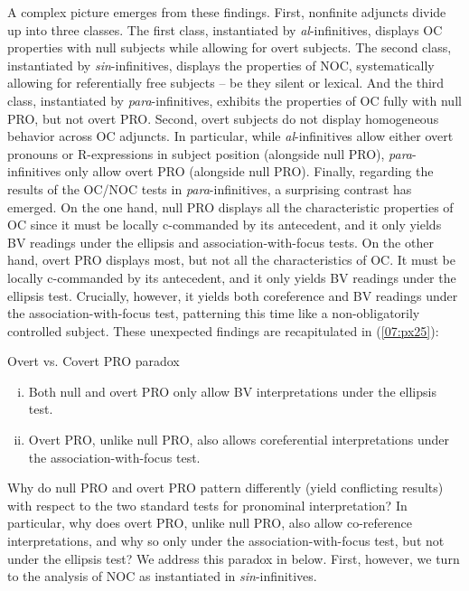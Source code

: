 \documentclass[output=paper,colorlinks,citecolor=brown,draft,draftmode]{langscibook}
\begin{document}
A complex picture emerges from these findings. First, nonfinite adjuncts divide up into three classes. The first class, instantiated by \textit{al}-infinitives, displays OC properties with null subjects while allowing for overt subjects. The second class, instantiated by \textit{sin}-infinitives, displays the properties of NOC, systematically allowing for referentially free subjects -- be they silent or lexical. And the third class, instantiated by \textit{para}-infinitives, exhibits the properties of OC fully with null PRO, but not overt PRO.
Second, overt subjects do not display homogeneous behavior across OC adjuncts. In particular, while  \textit{al}-infinitives allow either overt pronouns or R-expressions in subject position (alongside null PRO), \textit{para}-infinitives only allow overt PRO (alongside null PRO).
Finally, regarding the results of the OC/NOC tests in \textit{para}-infinitives, a surprising contrast has emerged. On the one hand, null PRO displays all the characteristic properties of OC since it must be locally c-commanded by its antecedent, and it only yields BV readings under the ellipsis and association-with-focus tests. On the other hand, overt PRO displays most, but not all the characteristics of OC. It must be locally c-commanded by its antecedent, and it only yields BV readings under the ellipsis test. Crucially, however, it yields both coreference and BV readings under the association-with-focus test, patterning this time like a non-obligatorily controlled subject. These unexpected findings are recapitulated in (\ref{07:px25}):

\ea\label{07:px25}
{Overt vs. Covert PRO paradox}
\begin{enumerate}[(i)]
    \item Both null and overt PRO only allow BV interpretations under the ellipsis test.
    \item Overt PRO, unlike null PRO, also allows coreferential interpretations under the association-with-focus test.
\end{enumerate}
    Why do null PRO and overt PRO pattern differently (yield conflicting results) with respect to the two standard tests for pronominal interpretation? In particular, why does overt PRO, unlike null PRO,
    also allow co-reference interpretations,
    and why so only under the association-with-focus test, but not under the ellipsis test?
\z
We address this paradox in  below. First, however, we turn to the analysis of NOC as instantiated in \textit{sin}-infinitives.
\end{document}
